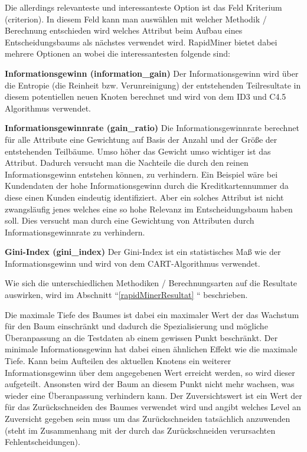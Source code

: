 Die allerdings relevanteste und interessanteste Option ist das Feld Kriterium (criterion). In diesem Feld kann man auswählen mit welcher Methodik / Berechnung entschieden wird welches Attribut beim Aufbau eines Entscheidungsbaums als nächstes verwendet wird. RapidMiner bietet dabei mehrere Optionen an wobei die interessantesten folgende sind:

\begin{pitemize}
\item \textbf{Informationsgewinn (information\_gain)} Der Informationsgewinn wird über die Entropie (die Reinheit bzw. Verunreinigung) der entstehenden Teilresultate in diesem potentiellen neuen Knoten berechnet und wird von dem ID3 und C4.5 Algorithmus verwendet.
\item \textbf{Informationsgewinnrate (gain\_ratio)} Die Informationsgewinnrate berechnet für alle Attribute eine Gewichtung auf Basis der Anzahl und der Größe der entstehenden Teilbäume. Umso höher das Gewicht umso wichtiger ist das Attribut. Dadurch versucht man die Nachteile die durch den reinen Informationsgewinn entstehen können, zu verhindern. Ein Beispiel wäre bei Kundendaten der hohe Informationsgewinn durch die Kreditkartennummer da diese einen Kunden eindeutig identifiziert. Aber ein solches Attribut ist nicht zwangsläufig jenes welches eine so hohe Relevanz im Entscheidungsbaum haben soll. Dies versucht man durch eine Gewichtung von Attributen durch Informationsgewinnrate zu verhindern. \cite{rapidminer_rapidminer_2015} \cite{johannes_furnkranz_decision-tree_2008}
\item \textbf{Gini-Index (gini\_index)} Der Gini-Index ist ein statistisches Maß wie der Informationsgewinn und wird von dem CART-Algorithmus verwendet.
\end{pitemize}

Wie sich die unterschiedlichen Methodiken / Berechnungsarten auf die Resultate auswirken, wird im Abschnitt ``\ref{rapidMinerResultat} `` beschrieben.

Die maximale Tiefe des Baumes ist dabei ein maximaler Wert der das Wachstum für den Baum einschränkt und dadurch die Spezialisierung und mögliche Überanpassung an die Testdaten ab einem gewissen Punkt beschränkt. Der minimale Informationsgewinn hat dabei einen ähnlichen Effekt wie die maximale Tiefe. Kann beim Aufteilen des aktuellen Knotens ein weiterer Informationsgewinn über dem angegebenen Wert erreicht werden, so wird dieser aufgeteilt. Ansonsten wird der Baum an diesem Punkt nicht mehr wachsen, was wieder eine Überanpassung verhindern kann. Der Zuversichtswert ist ein Wert der für das Zurückschneiden des Baumes verwendet wird und angibt welches Level an Zuversicht gegeben sein muss  um das Zurückschneiden tatsächlich anzuwenden (steht im Zusammenhang mit der durch das Zurückschneiden verursachten Fehlentscheidungen). \cite{rapidminer_rapidminer_2015}

